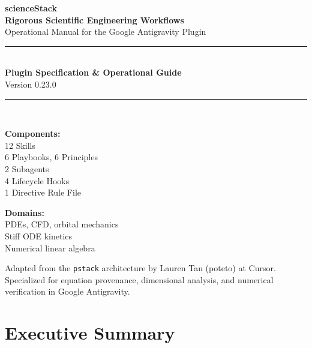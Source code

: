 \documentclass[11pt,a4paper]{report}
\begin{document}
\begin{titlepage}
    \centering
    \vspace*{1.5cm}
    {\Huge \bfseries \color{primarynavy} scienceStack}\\[0.4cm]
    {\Large \bfseries \color{secondaryblue} Rigorous Scientific Engineering Workflows}\\[0.2cm]
    {\large \textsf{Operational Manual for the Google Antigravity Plugin}}\\[1.5cm]
    \rule{\linewidth}{1.5pt}\\[0.6cm]
    {\large \textbf{Plugin Specification \& Operational Guide}}\\[0.2cm]
    {\normalsize Version 0.23.0}\\[0.6cm]
    \rule{\linewidth}{1.5pt}\\[2.5cm]
    \begin{minipage}{0.48\textwidth}
        \begin{flushleft} \large
            \textbf{Components:}\\
            12 Skills\\
            6 Playbooks, 6 Principles\\
            2 Subagents\\
            4 Lifecycle Hooks\\
            1 Directive Rule File
        \end{flushleft}
    \end{minipage}
    \hfill
    \begin{minipage}{0.48\textwidth}
        \begin{flushright} \large
            \textbf{Domains:}\\
            PDEs, CFD, orbital mechanics\\
            Stiff ODE kinetics\\
            Numerical linear algebra
        \end{flushright}
    \end{minipage}
    \vfill
    {\small \textsf{Adapted from the \texttt{pstack} architecture by Lauren Tan (poteto) at Cursor.}\\
    \textsf{Specialized for equation provenance, dimensional analysis, and numerical verification in Google Antigravity.}}\\[0.8cm]
\end{titlepage}

\tableofcontents
\newpage

\section*{Executive Summary}
\end{document}
